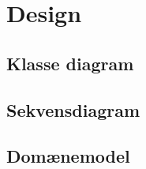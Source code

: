 \section{Design}

\subsection{Klasse diagram}


\subsection{Sekvensdiagram}


\subsection{Domænemodel}